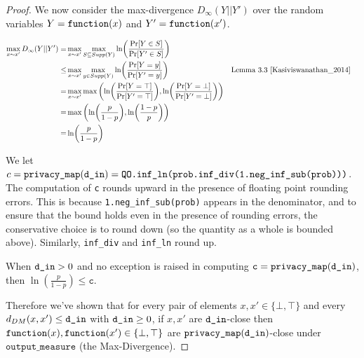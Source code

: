 \documentclass{article}
\begin{document}
\begin{proof}
We now consider the max-divergence $D_{\infty}(Y||Y')$ over the random variables $Y = \texttt{function}(x)$ and $Y' = \texttt{function}(x')$.

\begin{align*}
    \max_{x \sim x'} D_{\infty}(Y||Y')
    =& \max_{x \sim x'} \max_{S \subseteq Supp(Y)}\ln (\frac{\Pr[Y \in S]}{\Pr[Y' \in S]}) \\
    \le& \max_{x \sim x'} \max_{y \in Supp(Y)}\ln (\frac{\Pr[Y = y]}{\Pr[Y' = y]}) &&\text{Lemma 3.3 } \cite{Kasiviswanathan_2014} \\
    =& \max_{x \sim x'} \max\left(\ln (\frac{\Pr[Y = \top]}{\Pr[Y' = \top]}), \ln(\frac{\Pr[Y = \bot]}{\Pr[Y' = \bot]})\right) \\
    =& \max\left(\ln (\frac{p}{1 - p}), \ln(\frac{1 - p}{p})\right) \\
    =& \ln (\frac{p}{1 - p})
\end{align*}

We let $c = \texttt{privacy\_map}(\texttt{d\_in}) = \texttt{QO.inf\_ln(prob.inf\_div(1.neg\_inf\_sub(prob)))}$.
The computation of \texttt{c} rounds upward in the presence of floating point rounding errors. 
This is because \texttt{1.neg\_inf\_sub(prob)} appears in the denominator, and to ensure that the bound holds even in the presence of rounding errors, the conservative choice is to round down (so the quantity as a whole is bounded above). 
Similarly, \texttt{inf\_div} and \texttt{inf\_ln} round up. 

When $\texttt{d\_in} > 0$ and no exception is raised in computing $\texttt{c} = \texttt{privacy\_map}(\texttt{d\_in})$, then $\ln\left(\frac{p}{1 - p}\right) \leq \texttt{c}$. 

Therefore we've shown that for every pair of elements $x, x' \in \{\bot, \top\}$ and every $d_{DM}(x, x') \le \texttt{d\_in}$ with $\texttt{d\_in} \ge 0$, 
if $x, x'$ are $\texttt{d\_in}$-close then $\texttt{function}(x),\texttt{function}(x') \in \{\bot, \top\}$ are $\texttt{privacy\_map}(\texttt{d\_in})$-close under $\texttt{output\_measure}$ (the Max-Divergence).
\end{proof}




\end{document}
